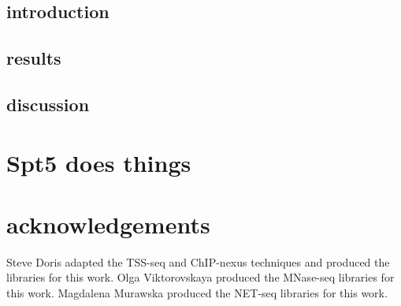 \documentclass[11pt, a4paper]{article}
\begin{document}
\subsection{introduction}
\subsection{results}
\subsection{discussion}

\section{Spt5 does things}

\section{acknowledgements}

Steve Doris adapted the TSS-seq and ChIP-nexus techniques and produced the libraries for this work. Olga Viktorovskaya produced the MNase-seq libraries for this work. Magdalena Murawska produced the NET-seq libraries for this work.

{}

\end{document}
